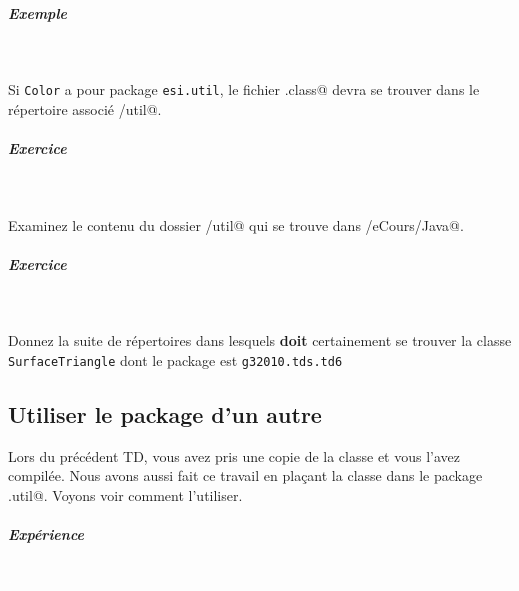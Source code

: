 \documentclass[11pt,a4paper]{article}
\begin{document}
			
		\subparagraph{Exemple} 
		
					\textcolor{white}{.} \par
				
            \par
        
				Si \verb|Color| 
				a pour package \verb|esi.util|,
				le fichier \verb@Color.class@
				devra se trouver dans le r\'epertoire associ\'e 
				\verb@esi/util@.
			
            \par
        
			
		\subparagraph{Exercice} 
		
					\textcolor{white}{.} \par
				
            \par
        
				Examinez le contenu du dossier 
				\verb@esi/util@
				qui se trouve dans 
				\verb@/eCours/Java@.
			
            \par
        
			
		\subparagraph{Exercice} 
		
                \textcolor{white}{.} \par
            
						Donnez la suite de r\'epertoires dans lesquels 
						\textbf{doit} certainement
						se trouver la classe \verb|SurfaceTriangle|
						dont le package est \verb|g32010.tds.td6| \textcolor{gray}{\underline{\hspace*{10em}}} \subsection{Utiliser le package d'un autre}
			Lors du pr\'ec\'edent TD,
			vous avez pris une copie de la classe
			\verb@Color@
			et vous l'avez compil\'ee.
			Nous avons aussi fait ce travail
			en pla\c cant la classe dans le package
			\verb@esi.util@.
			Voyons voir comment l'utiliser.			
		
            \par
        
			
		\subparagraph{Exp\'erience} 
		
					\textcolor{white}{.} \par
				
            \par
        
\end{document}
